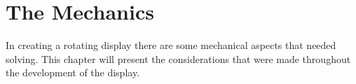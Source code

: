 \section{The Mechanics}
In creating a rotating display there are some mechanical aspects that needed solving.
This chapter will present the considerations that were made throughout the development of the display.